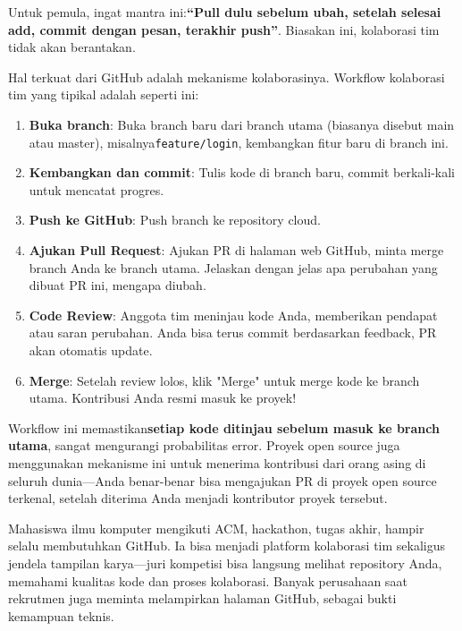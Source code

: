 Untuk pemula, ingat mantra ini:\textbf{“Pull dulu sebelum ubah, setelah selesai add, commit dengan pesan, terakhir push”}. Biasakan ini, kolaborasi tim tidak akan berantakan.


Hal terkuat dari GitHub adalah mekanisme kolaborasinya. Workflow kolaborasi tim yang tipikal adalah seperti ini:

\begin{enumerate}
  \item \textbf{Buka branch}: Buka branch baru dari branch utama (biasanya disebut main atau master), misalnya\texttt{feature/\allowbreak login}, kembangkan fitur baru di branch ini.
  \item \textbf{Kembangkan dan commit}: Tulis kode di branch baru, commit berkali-kali untuk mencatat progres.
  \item \textbf{Push ke GitHub}: Push branch ke repository cloud.
  \item \textbf{Ajukan Pull Request}: Ajukan PR di halaman web GitHub, minta merge branch Anda ke branch utama. Jelaskan dengan jelas apa perubahan yang dibuat PR ini, mengapa diubah.
  \item \textbf{Code Review}: Anggota tim meninjau kode Anda, memberikan pendapat atau saran perubahan. Anda bisa terus commit berdasarkan feedback, PR akan otomatis update.
  \item \textbf{Merge}: Setelah review lolos, klik "Merge" untuk merge kode ke branch utama. Kontribusi Anda resmi masuk ke proyek!
\end{enumerate}

Workflow ini memastikan\textbf{setiap kode ditinjau sebelum masuk ke branch utama}, sangat mengurangi probabilitas error. Proyek open source juga menggunakan mekanisme ini untuk menerima kontribusi dari orang asing di seluruh dunia—Anda benar-benar bisa mengajukan PR di proyek open source terkenal, setelah diterima Anda menjadi kontributor proyek tersebut.



Mahasiswa ilmu komputer mengikuti ACM, hackathon, tugas akhir, hampir selalu membutuhkan GitHub. Ia bisa menjadi platform kolaborasi tim sekaligus jendela tampilan karya—juri kompetisi bisa langsung melihat repository Anda, memahami kualitas kode dan proses kolaborasi. Banyak perusahaan saat rekrutmen juga meminta melampirkan halaman GitHub, sebagai bukti kemampuan teknis.


